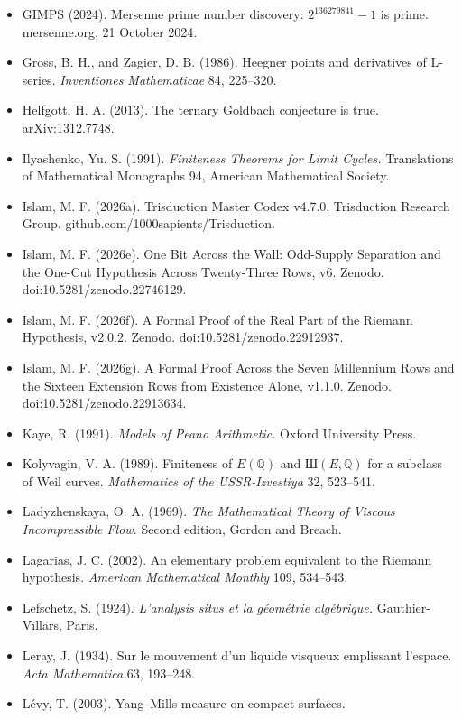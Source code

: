 \documentclass[10pt,twocolumn]{article}
\begin{document}
\begin{itemize}
{  Academy of Sciences} 24, 556--557.
\item
  GIMPS (2024). Mersenne prime number discovery: \(2^{136279841} - 1\)
  is prime. mersenne.org, 21 October 2024.
\item
  Gross, B. H., and Zagier, D. B. (1986). Heegner points and derivatives
  of L-series. \emph{Inventiones Mathematicae} 84, 225--320.
\item
  Helfgott, H. A. (2013). The ternary Goldbach conjecture is true.
  arXiv:1312.7748.
\item
  Ilyashenko, Yu. S. (1991). \emph{Finiteness Theorems for Limit
  Cycles.} Translations of Mathematical Monographs 94, American
  Mathematical Society.
\item
  Islam, M. F. (2026a). Trisduction Master Codex v4.7.0. Trisduction
  Research Group. github.com/1000sapients/Trisduction.
\item
  Islam, M. F. (2026e). One Bit Across the Wall: Odd-Supply Separation
  and the One-Cut Hypothesis Across Twenty-Three Rows, v6. Zenodo.
  doi:10.5281/zenodo.22746129.
\item
  Islam, M. F. (2026f). A Formal Proof of the Real Part of the Riemann
  Hypothesis, v2.0.2. Zenodo. doi:10.5281/zenodo.22912937.
\item
  Islam, M. F. (2026g). A Formal Proof Across the Seven Millennium Rows
  and the Sixteen Extension Rows from Existence Alone, v1.1.0. Zenodo.
  doi:10.5281/zenodo.22913634.
\item
  Kaye, R. (1991). \emph{Models of Peano Arithmetic.} Oxford University
  Press.
\item
  Kolyvagin, V. A. (1989). Finiteness of \(E(\mathbb{Q})\) and
  Ш\((E, \mathbb{Q})\) for a subclass of Weil curves. \emph{Mathematics
  of the USSR-Izvestiya} 32, 523--541.
\item
  Ladyzhenskaya, O. A. (1969). \emph{The Mathematical Theory of Viscous
  Incompressible Flow.} Second edition, Gordon and Breach.
\item
  Lagarias, J. C. (2002). An elementary problem equivalent to the
  Riemann hypothesis. \emph{American Mathematical Monthly} 109,
  534--543.
\item
  Lefschetz, S. (1924). \emph{L'analysis situs et la géométrie
  algébrique.} Gauthier-Villars, Paris.
\item
  Leray, J. (1934). Sur le mouvement d'un liquide visqueux emplissant
  l'espace. \emph{Acta Mathematica} 63, 193--248.
\item
  Lévy, T. (2003). Yang--Mills measure on compact surfaces.

\end{itemize}
\end{document}
